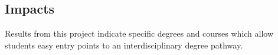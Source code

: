 \documentclass[
  journal,
]{IEEEtran}%
\begin{document}
\hypertarget{impacts}{%
\subsection{Impacts}\label{impacts}}

Results from this project indicate specific degrees and courses which
allow students easy entry points to an interdisciplinary degree pathway.


\ifCLASSOPTIONcaptionsoff
  \newpage
\fi


\end{document}
